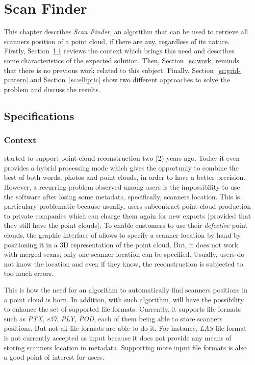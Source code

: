\chapter{Scan Finder}
\label{ch:scanfinder}
This chapter describes \emph{Scan Finder}, an algorithm that can be used to retrieve all scanners position of a point cloud,  if there are any, regardless of its nature. Firstly, Section~\ref{sc:spec} reviews the context which brings this need and describes some characteristics of the expected solution. Then, Section~\ref{sc:work} reminds that there is no previous work related to this subject. Finally, Section~\ref{sc:grid-pattern} and Section~\ref{sc:elliptic} show two different approaches to solve the problem and discuss the results.

\section{Specifications}
\label{sc:spec}
\subsection{Context}
\CC started to support point cloud reconstruction two (2) years ago. Today it even provides a hybrid processing mode which gives the opportuniy to combine the best of both words, photos and point clouds, in order to have a better precision. However, a recurring problem observed among \CC users is the impossibility to use the software after losing some metadata, specifically, scanners location. This is particulary problematic because usually, \CC users subcontract point cloud production to private companies which can charge them again for new exports (provided that they still have the point clouds). To enable customers to use their \emph{defective} point clouds, the graphic interface of \CC allows to specify a scanner location by hand by positioning it in a 3D representation of the point cloud. But, it does not work with merged scans; only one scanner location can be specified. Usually, users do not know the location and even if they know, the reconstruction is subjected to too much errors.

This is how the need for an algorithm to automatically find scanners positions in a point cloud is born. In addition, with such algorithm, \CC will have the possibility to enhance the set of supported file formats. Currently, it supports file formats such as \emph{PTX}, \emph{e57}, \emph{PLY}, \emph{POD}, each of them being able to store scanners positions. But not all file formats are able to do it. For instance, \emph{LAS} file format is not currently accepted as input because it does not provide any means of storing scanners location in metadata. Supporting more input file formats is also a good point of interest for \CC users.

